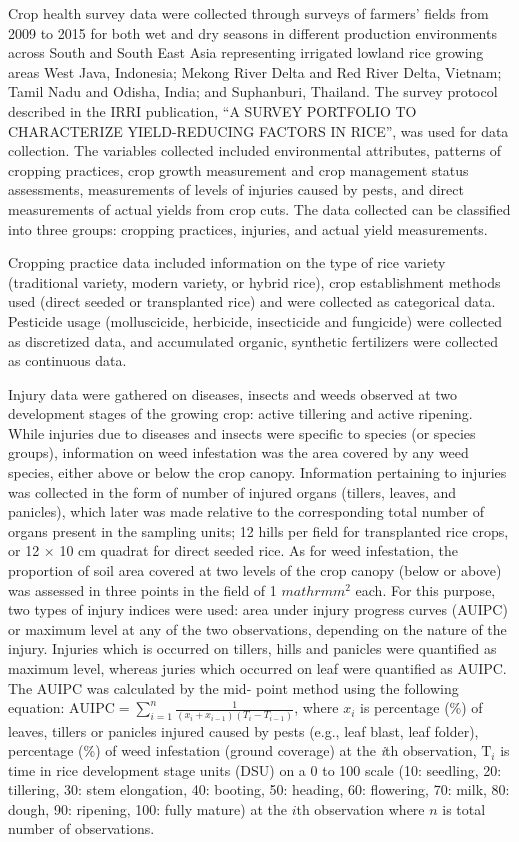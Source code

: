 Crop health survey data were collected through surveys of farmers' fields from 2009 to 2015 for both wet and dry seasons in different production environments across South and South East Asia representing irrigated lowland rice growing areas West Java, Indonesia; Mekong River Delta and Red River Delta, Vietnam; Tamil Nadu and Odisha, India; and Suphanburi, Thailand. The survey protocol described in the IRRI publication, ``A SURVEY PORTFOLIO TO CHARACTERIZE YIELD-REDUCING FACTORS IN RICE'',  was used for data collection. The variables collected included environmental attributes, patterns of cropping practices, crop growth measurement and crop management status assessments, measurements of levels of injuries caused by pests, and direct measurements of actual yields from crop cuts. The data collected can be classified into three groups: cropping practices, injuries, and actual yield measurements.

Cropping practice data included information on the type of rice variety (traditional variety, modern variety, or hybrid rice), crop establishment methods used (direct seeded or transplanted rice) and were collected as categorical data. Pesticide usage (molluscicide, herbicide, insecticide and fungicide) were collected as discretized data, and accumulated organic, synthetic fertilizers were collected as continuous data.

Injury data were gathered on diseases, insects and weeds observed at two development stages of the growing crop: active tillering and active ripening. While injuries due to diseases and insects were specific to species (or species groups), information on weed infestation was the area covered by any weed species, either above or below the crop canopy. Information pertaining to injuries was collected in the form of number of injured organs (tillers, leaves, and panicles), which later was made relative to the corresponding total number of organs present in the sampling units; 12 hills per field for transplanted rice crops, or 12 $\times$ 10 cm quadrat for direct seeded rice. As for weed infestation, the proportion of soil area covered at two levels of the crop canopy (below or above) was assessed in three points in the field of 1 $mathrm{m}^{2}$ each. For this purpose, two types of injury indices were used: area under injury progress curves (AUIPC) or maximum level at any of the two observations, depending on the nature of the injury. Injuries which is occurred on tillers, hills and panicles were quantified as maximum level, whereas juries which occurred on leaf were quantified as AUIPC. The AUIPC was calculated by the mid- point method using the following equation: $\mathrm{AUIPC} = \sum\limits_{i=1}^n\frac{1}{(x_{i} + x_{i-1})(T_{i} - T_{i-1})}$, where $x_i$ is percentage (\%) of leaves, tillers or panicles injured caused by pests (e.g., leaf blast, leaf folder), percentage (\%) of weed infestation (ground coverage) at the \textit{i}th observation, $\mathrm{T}_{i}$ is time in rice development stage units (DSU) on a 0 to 100 scale (10: seedling, 20: tillering, 30: stem elongation, 40: booting, 50: heading, 60: flowering, 70: milk, 80: dough, 90: ripening, 100: fully mature) at the $i$th observation where $n$ is total number of observations.


